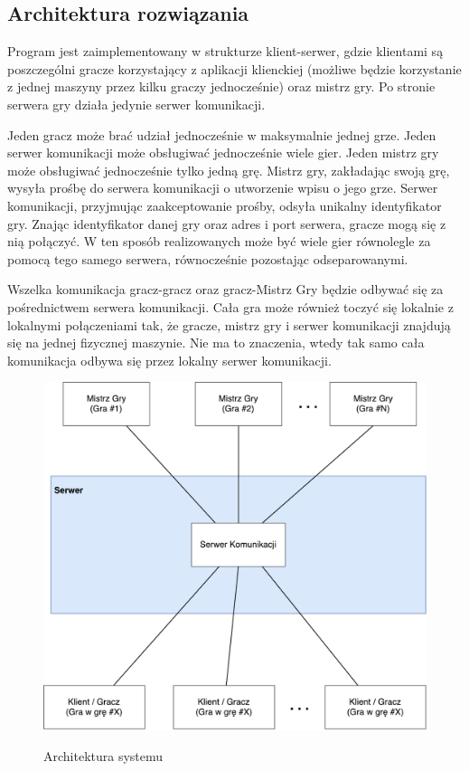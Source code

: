 \documentclass[11pt]{article}
\let\Oldsubsection\subsection
\renewcommand{\subsection}{\FloatBarrier\Oldsubsection}
\begin{document}
\subsection{Architektura rozwiązania}
\par
Program jest zaimplementowany w strukturze klient-serwer, gdzie klientami są poszczególni gracze korzystający z aplikacji klienckiej (możliwe będzie korzystanie z jednej maszyny przez kilku graczy jednocześnie) oraz mistrz gry. Po stronie serwera gry działa jedynie serwer komunikacji.
\par
Jeden gracz może brać udział jednocześnie w maksymalnie jednej grze. Jeden serwer komunikacji może obsługiwać jednocześnie wiele gier. Jeden mistrz gry może obsługiwać jednocześnie tylko jedną grę. Mistrz gry, zakładając swoją grę, wysyła prośbę do serwera komunikacji o utworzenie wpisu o jego grze. Serwer komunikacji, przyjmując zaakceptowanie prośby, odsyła unikalny identyfikator gry. Znając identyfikator danej gry oraz adres i port serwera, gracze mogą się z nią połączyć. W ten sposób realizowanych może być wiele gier równolegle za pomocą tego samego serwera, równocześnie pozostając odseparowanymi.
\par
Wszelka komunikacja gracz-gracz oraz gracz-Mistrz Gry będzie odbywać się za pośrednictwem serwera komunikacji. Cała gra może również toczyć się lokalnie z lokalnymi połączeniami tak, że gracze, mistrz gry i serwer komunikacji znajdują się na jednej fizycznej maszynie. Nie ma to znaczenia, wtedy tak samo cała komunikacja odbywa się przez lokalny serwer komunikacji.

\begin{center}
\begin{figure}[!h]
\caption{Architektura systemu}
\resizebox{\textwidth}{!}
{
\includegraphics{../res/architecture.pdf}
}
\end{figure}
\end{center}
\FloatBarrier
\end{document}
